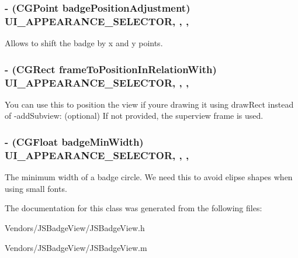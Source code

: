 \subsubsection[{U\+I\+\_\+\+A\+P\+P\+E\+A\+R\+A\+N\+C\+E\+\_\+\+S\+E\+L\+E\+C\+T\+O\+R}]{\setlength{\rightskip}{0pt plus 5cm}-\/ (C\+G\+Point badge\+Position\+Adjustment) U\+I\+\_\+\+A\+P\+P\+E\+A\+R\+A\+N\+C\+E\+\_\+\+S\+E\+L\+E\+C\+T\+O\+R\hspace{0.3cm}{\ttfamily [read]}, {\ttfamily [write]}, {\ttfamily [nonatomic]}, {\ttfamily [assign]}}\label{interface_j_s_badge_view_a65822242c01df7e96d24a2ae8d50e1d7}
Allows to shift the badge by x and y points. \hypertarget{interface_j_s_badge_view_accf68183f518eac65f4143fc7e991a74}{}
\subsubsection[{U\+I\+\_\+\+A\+P\+P\+E\+A\+R\+A\+N\+C\+E\+\_\+\+S\+E\+L\+E\+C\+T\+O\+R}]{\setlength{\rightskip}{0pt plus 5cm}-\/ (C\+G\+Rect frame\+To\+Position\+In\+Relation\+With) U\+I\+\_\+\+A\+P\+P\+E\+A\+R\+A\+N\+C\+E\+\_\+\+S\+E\+L\+E\+C\+T\+O\+R\hspace{0.3cm}{\ttfamily [read]}, {\ttfamily [write]}, {\ttfamily [nonatomic]}, {\ttfamily [assign]}}\label{interface_j_s_badge_view_accf68183f518eac65f4143fc7e991a74}
You can use this to position the view if you\textquotesingle{}re drawing it using draw\+Rect instead of {\ttfamily -\/add\+Subview\+:} (optional) If not provided, the superview frame is used. \hypertarget{interface_j_s_badge_view_aeb596726c9166c81a8c56ab9e069c91f}{}
\subsubsection[{U\+I\+\_\+\+A\+P\+P\+E\+A\+R\+A\+N\+C\+E\+\_\+\+S\+E\+L\+E\+C\+T\+O\+R}]{\setlength{\rightskip}{0pt plus 5cm}-\/ (C\+G\+Float badge\+Min\+Width) U\+I\+\_\+\+A\+P\+P\+E\+A\+R\+A\+N\+C\+E\+\_\+\+S\+E\+L\+E\+C\+T\+O\+R\hspace{0.3cm}{\ttfamily [read]}, {\ttfamily [write]}, {\ttfamily [nonatomic]}, {\ttfamily [assign]}}\label{interface_j_s_badge_view_aeb596726c9166c81a8c56ab9e069c91f}
The minimum width of a badge circle. We need this to avoid elipse shapes when using small fonts. 

The documentation for this class was generated from the following files\+:\begin{DoxyCompactItemize}
\item 
Vendors/\+J\+S\+Badge\+View/J\+S\+Badge\+View.\+h\item 
Vendors/\+J\+S\+Badge\+View/J\+S\+Badge\+View.\+m\end{DoxyCompactItemize}

